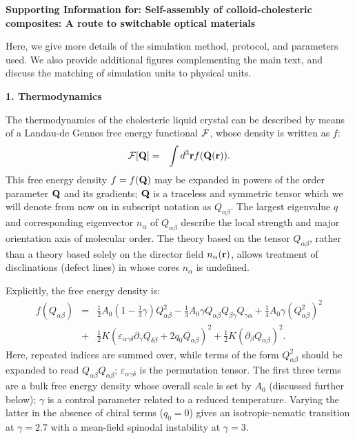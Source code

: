 \documentclass[12pt,twoside]{article}
\begin{document}
{\bf Supporting Information for: Self-assembly of colloid-cholesteric composites: A route to switchable optical materials}

Here, we give more details of the simulation method, protocol, and parameters used. We also provide additional figures complementing the main text, and discuss the matching of simulation units to physical units. 

{\bf 1. Thermodynamics}

The thermodynamics of the cholesteric liquid crystal can be described
by means of a  Landau-de Gennes free energy functional $\cal F$,
whose density is written as $f$:
\begin{eqnarray}
{\cal F}[{\bf Q}]&=&\int d^3{\bf r} f({\bf Q}({\bf r})).
\end{eqnarray}
This free energy density $f = f({\bf Q})$ may be expanded in powers of the
order parameter ${\bf Q}$ and its gradients; ${\bf Q}$ is a traceless 
and symmetric tensor which we will denote from now on in subscript
notation as $Q_{\alpha\beta}$.
The largest eigenvalue $q$ and corresponding eigenvector $n_\alpha$
of $Q_{\alpha\beta}$ describe the local strength and major orientation axis
of molecular order.
The theory based on the tensor $Q_{\alpha\beta}$, rather than a theory based
solely
on the director field $n_\alpha ({\bf r})$, allows treatment of disclinations
(defect lines) in whose cores $n_\alpha$ is undefined.

Explicitly, the free energy density is:
\begin{eqnarray}
f(Q_{\alpha\beta}) &=& {\textstyle \frac{1}{2}} A_0
 \left(1- {\textstyle \frac{1}{3}}\gamma \right)Q^2_{\alpha \beta}
-{\textstyle \frac{1}{3}}A_0\gamma Q_{\alpha \beta} Q_{\beta \gamma}Q_{\gamma \alpha} 
+ {\textstyle \frac{1}{4}} A_0\gamma (Q^2_{\alpha \beta})^2  \nonumber\\
&+& {\textstyle \frac{1}{2}} K(\varepsilon_{\alpha \gamma \delta}
\partial_\gamma Q_{\delta \beta} + 2 q_0 Q_{\alpha \beta})^2
+ {\textstyle \frac{1}{2}} K (\partial_\beta Q_{\alpha \beta})^2.
\label{free}
\end{eqnarray}
Here, repeated indices are summed over, while terms of the form
$Q^2_{\alpha\beta}$ should be expanded to read $Q_{\alpha\beta}Q_{\alpha\beta}$;
$\varepsilon_{\alpha\gamma\delta}$ is the permutation tensor.
The first three terms are a bulk free energy density whose overall scale
is set by $A_0$ (discussed further below); $\gamma$ is a control parameter
related to a reduced temperature. Varying the latter in the absence of
chiral terms ($q_0=0$) gives an isotropic-nematic transition at
$\gamma = 2.7$ with a mean-field spinodal instability at $\gamma = 3$.
\end{document}
